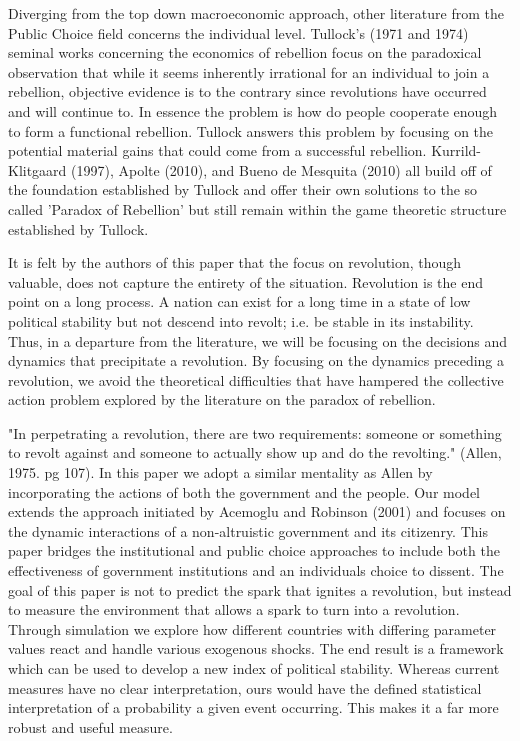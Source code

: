 \documentclass[12pt]{article}
\begin{document}
\begin{spacing}{1.5}
Diverging from the top down macroeconomic approach, other literature from the Public Choice field concerns the individual level. Tullock's (1971 and 1974) seminal works concerning the economics of rebellion focus on the paradoxical observation that while it seems inherently irrational for an individual to join a rebellion, objective evidence is to the contrary since revolutions have occurred and will continue to. In essence the problem is how do people cooperate enough to form a functional rebellion. Tullock answers this problem by focusing on the potential material gains that could come from a successful rebellion. Kurrild-Klitgaard (1997), Apolte (2010), and Bueno de Mesquita (2010) all build off of the foundation established by Tullock and offer their own solutions to the so called 'Paradox of Rebellion' but still remain within the game theoretic structure established by Tullock. 

It is felt by the authors of this paper that the focus on revolution, though valuable, does not capture the entirety of the situation. Revolution is the end point on a long process. A nation can exist for a long time in a state of low political stability but not descend into revolt; i.e. be stable in its instability. Thus, in a departure from the literature, we will be focusing on the decisions and dynamics that precipitate a revolution. By focusing on the dynamics preceding a revolution, we avoid the theoretical difficulties that have hampered the collective action problem explored by the literature on the paradox of rebellion.  



"In perpetrating a revolution, there are two requirements: someone or something to revolt against and someone to actually show up and do the revolting." (Allen, 1975. pg 107). In this paper we adopt a similar mentality as Allen by incorporating the actions of both the government and the people. Our model extends the approach initiated by Acemoglu and Robinson (2001) and focuses on the dynamic interactions of a non-altruistic government and its citizenry. This paper bridges the institutional and public choice approaches to include both the effectiveness of government institutions and an individuals choice to dissent. The goal of this paper is not to predict the spark that ignites a revolution, but instead to measure the environment that allows a spark to turn into a revolution. Through simulation we explore how different countries with differing parameter values react and handle various exogenous shocks. The end result is a framework which can be used to develop a new index of political stability. Whereas current measures have no clear interpretation, ours would have the defined statistical interpretation of a probability a given event occurring. This makes it a far more robust and useful measure.


\end{spacing}
\end{document}
